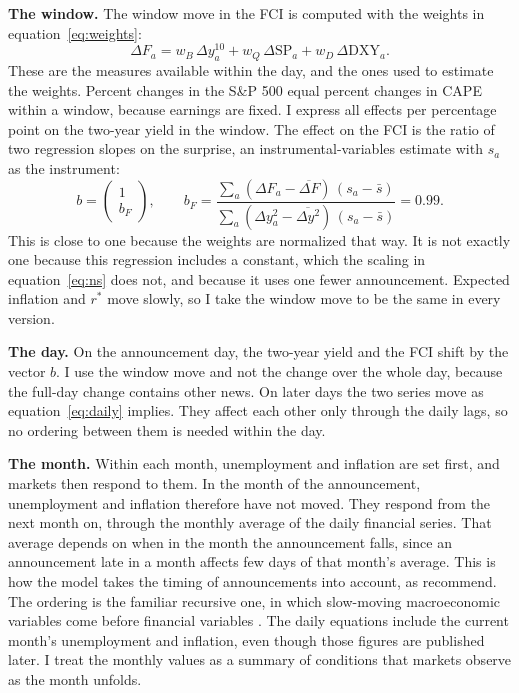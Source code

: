 \documentclass[11pt]{article}
\newcommand{\rs}{r^{*}}
\begin{document}
\textbf{The window.} The window move in the FCI is computed with the weights in equation~\eqref{eq:weights}:
\begin{equation}
\Delta F_a = w_B\, \Delta y^{10}_a + w_Q\, \Delta \text{SP}_a + w_D\, \Delta \text{DXY}_a. \label{eq:winfci}
\end{equation}
These are the measures available within the day, and the ones used to estimate the weights. Percent changes in the S\&P 500 equal percent changes in CAPE within a window, because earnings are fixed. I express all effects per percentage point on the two-year yield in the window. The effect on the FCI is the ratio of two regression slopes on the surprise, an instrumental-variables estimate with $s_a$ as the instrument:
\begin{equation}
b = \begin{pmatrix} 1 \\ b_F \end{pmatrix}, \qquad b_F = \frac{\sum_a (\Delta F_a - \overline{\Delta F})\,(s_a-\bar s)}{\sum_a (\Delta y^{2}_a - \overline{\Delta y^{2}})\,(s_a-\bar s)} = 0.99. \label{eq:impact}
\end{equation}
This is close to one because the weights are normalized that way. It is not exactly one because this regression includes a constant, which the scaling in equation~\eqref{eq:ns} does not, and because it uses one fewer announcement. Expected inflation and $\rs$ move slowly, so I take the window move to be the same in every version.

\textbf{The day.} On the announcement day, the two-year yield and the FCI shift by the vector $b$. I use the window move and not the change over the whole day, because the full-day change contains other news. On later days the two series move as equation~\eqref{eq:daily} implies. They affect each other only through the daily lags, so no ordering between them is needed within the day.

\textbf{The month.} Within each month, unemployment and inflation are set first, and markets then respond to them. In the month of the announcement, unemployment and inflation therefore have not moved. They respond from the next month on, through the monthly average of the daily financial series. That average depends on when in the month the announcement falls, since an announcement late in a month affects few days of that month's average. This is how the model takes the timing of announcements into account, as \citet{jacobson2026} recommend. The ordering is the familiar recursive one, in which slow-moving macroeconomic variables come before financial variables \citep{bernanke1992,christiano1999}. The daily equations include the current month's unemployment and inflation, even though those figures are published later. I treat the monthly values as a summary of conditions that markets observe as the month unfolds.
\end{document}

